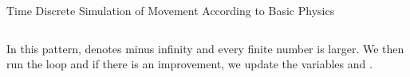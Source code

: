 \begin{task}{Time Discrete Simulation of Movement According to Basic Physics\up*}{}{}
\begin{enumerate}
{\begin{lstlisting}[language=Matlab]
    \end{lstlisting}
    In this pattern,  denotes minus infinity and every finite number is larger. We then run the loop and if there is an improvement, we update the variables  and . 

  }
  \end{enumerate}
  

  
\end{task}

%
%
